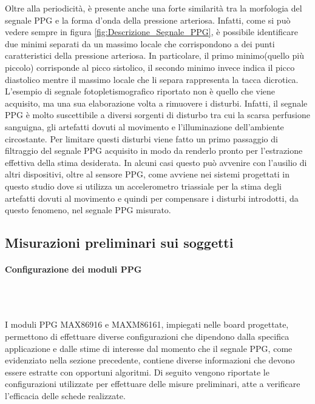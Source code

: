 Oltre alla periodicità, è presente anche una forte similarità tra la morfologia del segnale PPG e la forma d'onda della pressione arteriosa. Infatti, come si può vedere sempre in figura \ref{fig:Descrizione_Segnale_PPG}, è possibile identificare due minimi separati da un massimo locale che corrispondono a dei punti caratteristici della pressione arteriosa. In particolare, il primo minimo(quello più piccolo) corrisponde al picco sistolico, il secondo minimo invece indica il picco diastolico mentre il massimo locale che li separa rappresenta la tacca dicrotica. 
L'esempio di segnale fotopletismografico riportato non è quello che viene acquisito, ma una sua elaborazione volta a rimuovere i disturbi. Infatti, il segnale PPG è molto suscettibile a diversi sorgenti di disturbo tra cui la scarsa perfusione sanguigna, gli artefatti dovuti al movimento e l'illuminazione dell'ambiente circostante. Per limitare questi disturbi viene fatto un primo passaggio di filtraggio del segnale PPG acquisito in modo da renderlo pronto per l'estrazione effettiva della stima desiderata. In alcuni casi questo può avvenire con l'ausilio di altri dispositivi, oltre al sensore PPG, come avviene nei sistemi progettati in questo studio dove si utilizza un accelerometro triassiale per la stima degli artefatti dovuti al movimento e quindi per compensare i disturbi introdotti, da questo fenomeno, nel segnale PPG misurato.

\subsection{Misurazioni preliminari sui soggetti}


\paragraph{Configurazione dei moduli PPG}~

\noindent \\ I moduli PPG MAX86916 e MAXM86161, impiegati nelle board progettate, permettono di effettuare diverse configurazioni che dipendono dalla specifica applicazione e dalle stime di interesse dal momento che il segnale PPG, come evidenziato nella sezione precedente, contiene diverse informazioni che devono essere estratte con opportuni algoritmi. Di seguito vengono riportate le configurazioni utilizzate per effettuare delle misure preliminari, atte a verificare l'efficacia delle schede realizzate.

